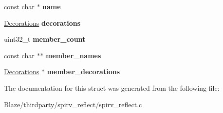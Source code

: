 \begin{DoxyCompactItemize}
\item 
\mbox{\label{structNode_adf35631bbcc77b0b0fe937d0f89ce418}} 
const char $\ast$ {\bfseries name}
\item 
\mbox{\label{structNode_aa14eee1c53c80bca0828a721dcdaceb4}} 
\hyperlink{structDecorations}{Decorations} {\bfseries decorations}
\item 
\mbox{\label{structNode_ae191d05bda511ce84ebc142c9bebbfde}} 
uint32\+\_\+t {\bfseries member\+\_\+count}
\item 
\mbox{\label{structNode_a82493c8f71e511be8843b6d5dd9d3769}} 
const char $\ast$$\ast$ {\bfseries member\+\_\+names}
\item 
\mbox{\label{structNode_a6b8bea3f5d6dfd4dc2399d200b47f7b8}} 
\hyperlink{structDecorations}{Decorations} $\ast$ {\bfseries member\+\_\+decorations}
\end{DoxyCompactItemize}


The documentation for this struct was generated from the following file\+:\begin{DoxyCompactItemize}
\item 
Blaze/thirdparty/spirv\+\_\+reflect/spirv\+\_\+reflect.\+c\end{DoxyCompactItemize}
